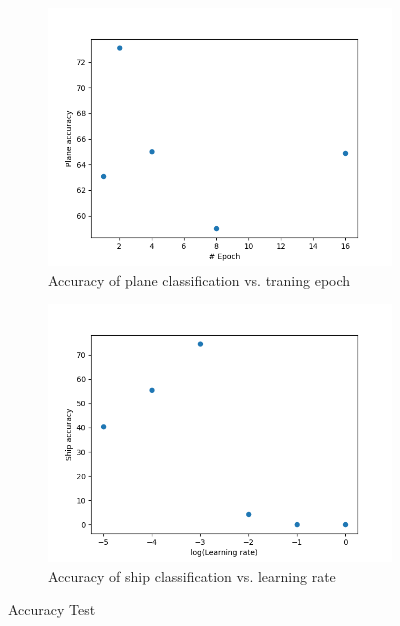 \documentclass{article}
\begin{document}
\begin{figure}
	\centering
	\begin{subfigure}[b]{0.4\textwidth}
		\centering
		\includegraphics[width=\textwidth]{img/epoch_accuracy.png}
		\caption{\label{fig:epoch-acc}Accuracy of plane classification vs. traning epoch}
	\end{subfigure}
	\hfill
	\begin{subfigure}[b]{0.4\textwidth}
		\centering
		\includegraphics[width=\textwidth]{img/lr_accuracy.png}
		\caption{\label{fig:lr-acc}Accuracy of ship classification vs. learning rate}
	\end{subfigure}
	\caption{\label{fig:acc}Accuracy Test}
\end{figure}
\end{document}
